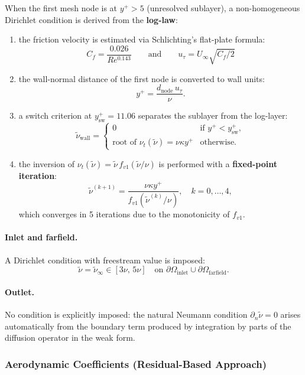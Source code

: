 When the first mesh node is at $y^+ > 5$ (unresolved sublayer), a non-homogeneous Dirichlet condition is derived from the \textbf{log-law}:
\begin{enumerate}[topsep=2ex]
\item the friction velocity is estimated via Schlichting's flat-plate formula:
\[
  C_f = \frac{0.026}{Re^{0.143}} \qquad\text{and}\qquad
  u_\tau = U_\infty\sqrt{C_f/2}
\]
\item the wall-normal distance of the first node is converted to wall units:
\[
  y^+ = \frac{d_\text{node}\, u_\tau}{\nu}.
\]
\item a switch criterion at $y^+_\text{sw} = 11.06$ separates the sublayer from the log-layer:
\[
  \tilde{\nu}_\text{wall} =
  \begin{cases}
    0 & \text{if } y^+ < y^+_\text{sw}, \\
    \text{root of } \nu_t(\tilde{\nu}) = \nu\kappa y^+ & \text{otherwise.}
  \end{cases}
\]
\item the inversion of $\nu_t(\tilde{\nu}) = \tilde{\nu}\,f_{v1}(\tilde{\nu}/\nu)$ is performed with a \textbf{fixed-point iteration}:
\[
  \tilde{\nu}^{(k+1)} = \frac{\nu\kappa y^+}{f_{v1}\!\left(\tilde{\nu}^{(k)}/\nu\right)},
  \quad k = 0,\ldots,4,
\]
which converges in 5 iterations due to the monotonicity of $f_{v1}$.
\end{enumerate}

\paragraph{Inlet and farfield.}
A Dirichlet condition with freestream value is imposed:
\begin{equation}
  \tilde{\nu} = \tilde{\nu}_\infty \in [3\nu,\, 5\nu]
  \quad \text{on } \partial\Omega_\text{inlet} \cup \partial\Omega_\text{farfield}.
\end{equation}

\paragraph{Outlet.}
No condition is explicitly imposed: the natural Neumann condition
$\partial_n\tilde{\nu} = 0$ arises automatically from the boundary term
produced by integration by parts of the diffusion operator in the weak form.

\subsubsection{Aerodynamic Coefficients (Residual-Based Approach)}
\label{sec:02_coef}

